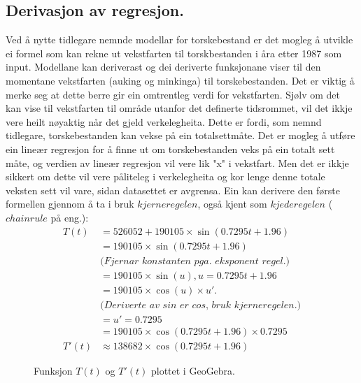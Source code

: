 \documentclass{report}
\begin{document}
\subsection{Derivasjon av regresjon.}
Ved å nytte tidlegare nemnde modellar for torskebestand er det mogleg å utvikle ei formel som kan rekne ut vekstfarten til torskbestanden i åra etter 1987 som input.
Modellane kan deriverast og dei deriverte funksjonane viser til den momentane vekstfarten (auking og minkinga) til torskebestanden.
Det er viktig å merke seg at dette berre gir ein omtrentleg verdi for vekstfarten.
Sjølv om det kan vise til vekstfarten til område utanfor det definerte tidsrommet, vil det ikkje vere heilt nøyaktig når det gjeld verkelegheita. Dette er fordi, som nemnd tidlegare, torskebestanden kan vekse på ein totalsettmåte.
Det er mogleg å utføre ein lineær regresjon for å finne ut om torskebestanden veks på ein totalt sett måte, og verdien av lineær regresjon vil vere lik "x" i vekstfart. Men det er ikkje sikkert om dette vil vere påliteleg i verkelegheita og kor lenge denne totale veksten sett vil vare, sidan datasettet er avgrensa.
Ein kan derivere den første formellen gjennom å ta i bruk $kjerneregelen$, også kjent som $kjederegelen$ ($chainrule$ på eng.):
\begin{align*} 
    T(t) &= 526052+190105\times \sin(0.7295t+1.96) \\ 
    &= 190105 \times \sin(0.7295t+1.96) \\
    & \textit{(Fjernar konstanten pga. eksponent regel.)} \\
    &= 190105 \times \sin(u), u=0.7295t+1.96 \\
    &= 190105 \times \cos(u) \times u'. \\
    & \textit{(Deriverte av sin er cos, bruk kjerneregelen.)} \\
    &= u' = 0.7295 \\
    &= 190105 \times \cos(0.7295t+1.96)\times 0.7295 \\
    T'(t) &\approx 138682 \times \cos(0.7295t+1.96)
\end{align*}
\begin{figure}[H]
    \centering
    \caption{Funksjon $T(t)$ og $T'(t)$ plottet i GeoGebra.}
    \label{TOGTDER}
\end{figure}
\end{document}
